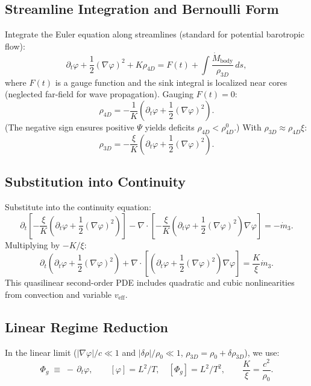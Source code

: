 \subsection{Streamline Integration and Bernoulli Form}

Integrate the Euler equation along streamlines (standard for potential barotropic flow):
\[
\partial_t \varphi + \frac{1}{2} (\nabla \varphi)^2 + K \rho_{4D} = F(t) + \int \frac{\dot{M}_{\text{body}}}{\rho_{3D}} \, ds,
\]
where $F(t)$ is a gauge function and the sink integral is localized near cores (neglected far-field for wave propagation). Gauging $F(t) = 0$:
\[
\rho_{4D} = -\frac{1}{K} \left( \partial_t \varphi + \frac{1}{2} (\nabla \varphi)^2 \right).
\]
(The negative sign ensures positive $\Psi$ yields deficits $\rho_{4D} < \rho_{4D}^0$.) With $\rho_{3D} \approx \rho_{4D} \xi$:
\[
\rho_{3D} = -\frac{\xi}{K} \left( \partial_t \varphi + \frac{1}{2} (\nabla \varphi)^2 \right).
\]

\subsection{Substitution into Continuity}

Substitute into the continuity equation:
\[
\partial_t \left[ -\frac{\xi}{K} \left( \partial_t \varphi + \frac{1}{2} (\nabla \varphi)^2 \right) \right] - \nabla \cdot \left[ -\frac{\xi}{K} \left( \partial_t \varphi + \frac{1}{2} (\nabla \varphi)^2 \right) \nabla \varphi \right] = -\dot{m}_{3}.
\]
Multiplying by $-K / \xi$:
\[
\partial_t \left( \partial_t \varphi + \frac{1}{2} (\nabla \varphi)^2 \right) + \nabla \cdot \left[ \left( \partial_t \varphi + \frac{1}{2} (\nabla \varphi)^2 \right) \nabla \varphi \right] = \frac{K}{\xi} \dot{m}_{3}.
\]
This quasilinear second-order PDE includes quadratic and cubic nonlinearities from convection and variable $v_{\text{eff}}$.

\subsection{Linear Regime Reduction}

In the linear limit ($|\nabla \varphi|/c \ll 1$ and $|\delta \rho|/\rho_0 \ll 1$, $\rho_{3D} = \rho_0 + \delta \rho_{3D}$), we use:
\begin{equation}
\Phi_g \;\equiv\; -\,\partial_t \varphi, 
\qquad [\varphi]=L^2/T, \quad [\Phi_g]=L^2/T^2,
\qquad \frac{K}{\xi}=\frac{c^{2}}{\rho_{0}}.
\end{equation}

